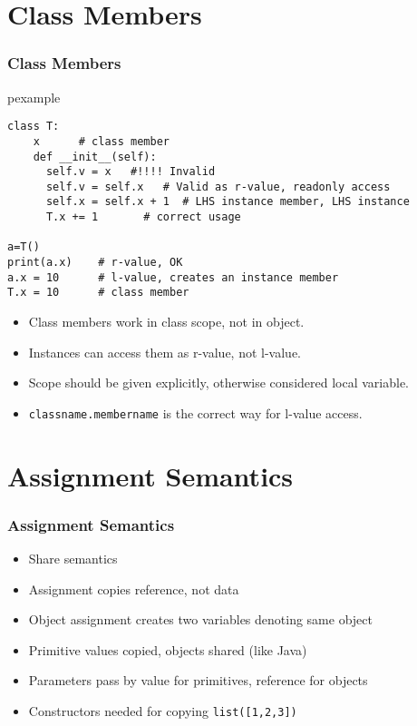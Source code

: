 \documentclass[trans,compress,xcolor=table]{beamer}
\begin{document}
\section{Class Members}
\begin{frame}[fragile]
\frametitle{Class Members}
\begin{beamercolorbox}{pexample}
\begin{lstlisting}
class T:
    x      # class member
    def __init__(self):
      self.v = x   #!!!! Invalid
      self.v = self.x   # Valid as r-value, readonly access
      self.x = self.x + 1  # LHS instance member, LHS instance
      T.x += 1       # correct usage

a=T()
print(a.x)    # r-value, OK
a.x = 10      # l-value, creates an instance member
T.x = 10      # class member
\end{lstlisting}
\end{beamercolorbox}
\begin{itemize}
\item Class members work in class scope, not in object.
\item Instances can access them as r-value, not l-value.
\item Scope should be given explicitly, otherwise considered local variable.
\item \lstinline!classname.membername! is the correct way for l-value access.
\end{itemize}
\end{frame}

\section{Assignment Semantics}
\begin{frame}
\frametitle{Assignment Semantics}
\begin{itemize}
\item Share semantics
\item Assignment copies reference, not data
\item Object assignment creates two variables denoting
	same object
\item Primitive values copied, objects shared (like Java)
\item Parameters pass by value for primitives, reference for
	objects
\item Constructors needed for copying \lstinline!list([1,2,3])!
\end{itemize}
\end{frame}
\end{document}
